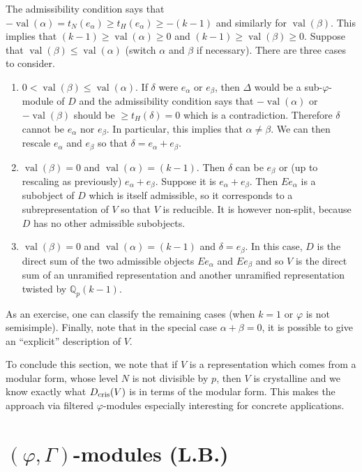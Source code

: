 \documentclass[11pt]{amsart}
\def\Qp{{\mathbb Q}_p}
\def\dcris{D_{\rm cris}}
\def\on{\operatorname}
\begin{document}
The admissibility condition says that $-\on{val}(\alpha) = 
t_N(e_\alpha) \geq t_H(e_\alpha) \geq -(k-1)$ and similarly for 
$\on{val}(\beta)$. This implies 
that $(k-1) \geq \on{val}(\alpha) \geq 0$ and   
$(k-1) \geq \on{val}(\beta) \geq 0$. Suppose that $\on{val}(\beta) 
\leq \on{val}(\alpha)$ (switch $\alpha$ and $\beta$ if necessary).  
There are three cases to consider. 
\begin{enumerate} 
\item $0 < \on{val}(\beta) \leq \on{val}(\alpha)$.  
 If $\delta$ were $e_\alpha$ or $e_\beta$, then $\Delta$ would be a 
 sub-$\varphi$-module of $D$ and the admissibility condition says that 
 $-\on{val}(\alpha)$ or $-\on{val}(\beta)$ should be $\geq 
 t_H(\delta)=0$ which is a contradiction.  
 Therefore $\delta$ 
  cannot be $e_\alpha$ nor $e_\beta$. 
In particular, this implies that $\alpha \neq \beta$. 
 We can then rescale $e_\alpha$ and 
  $e_\beta$ so that $\delta=e_\alpha+e_\beta$.  
\item $\on{val}(\beta)=0$ and $\on{val}(\alpha)=(k-1)$. Then $\delta$ 
  can be $e_\beta$ or (up to rescaling as previously) 
  $e_\alpha+e_\beta$. Suppose it is $e_\alpha+e_\beta$. Then $E 
  e_\alpha$ is a subobject of $D$ which is itself admissible, so it 
  corresponds to a subrepresentation of $V$ so that $V$ is 
  reducible. It is however non-split, because $D$ has no other 
  admissible subobjects.  
\item $\on{val}(\beta)=0$ and $\on{val}(\alpha)=(k-1)$ and 
  $\delta=e_\beta$. In this case, $D$ is the direct sum of the two 
  admissible objects $E e_\alpha$ and $E e_\beta$ and so 
  $V$ is the direct sum of an unramified representation and another
  unramified representation twisted by
  $\Qp(k-1)$.   
\end{enumerate} 
 
As an exercise, one can classify the remaining cases (when $k=1$ or 
$\varphi$ is not semisimple). Finally, note that in the special case 
$\alpha+\beta=0$, it is possible to give an ``explicit'' description 
of $V$.  
 
To conclude this section, we note that if $V$ is a representation 
which comes from a modular form, whose level $N$ is not divisible by 
$p$, then $V$ is crystalline and we know exactly what $\dcris(V)$ is 
in terms of the modular form. This makes the approach via filtered 
$\varphi$-modules especially interesting for concrete applications. 
 
 
\section{$(\varphi,\Gamma)$-modules (L.B.)}\label{LB3} 
 
\end{document}
